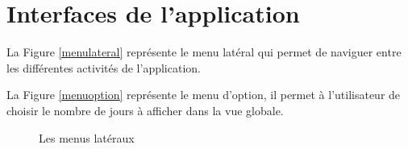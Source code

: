 \section{Interfaces de l'application}

La Figure \ref{menulateral} repr\'esente le menu lat\'eral qui permet de naviguer entre les diff\'erentes activit\'es de l'application.

La Figure \ref{menuoption} repr\'esente le menu d'option, il permet \`a l'utilisateur de choisir le nombre de jours \`a afficher dans la vue globale.
\begin{figure}[H]
\centering
	
		
	\caption{Les menus lat\'eraux}
	\label{home}
	
\end{figure}
